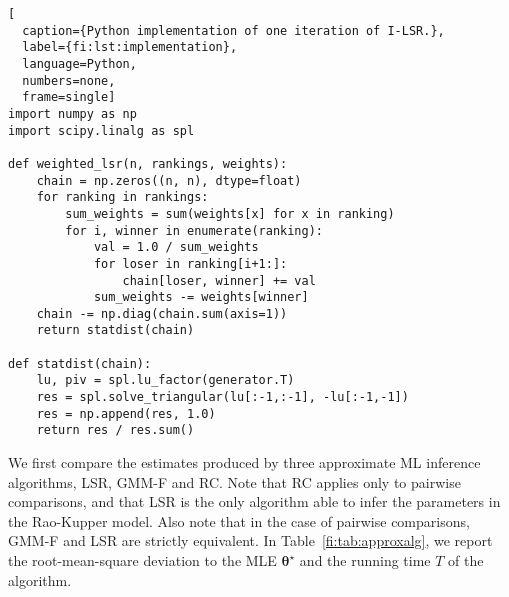\begin{lstlisting}[
  caption={Python implementation of one iteration of I-LSR.},
  label={fi:lst:implementation},
  language=Python,
  numbers=none,
  frame=single]
import numpy as np
import scipy.linalg as spl

def weighted_lsr(n, rankings, weights):
    chain = np.zeros((n, n), dtype=float)
    for ranking in rankings:
        sum_weights = sum(weights[x] for x in ranking)
        for i, winner in enumerate(ranking):
            val = 1.0 / sum_weights
            for loser in ranking[i+1:]:
                chain[loser, winner] += val
            sum_weights -= weights[winner]
    chain -= np.diag(chain.sum(axis=1))
    return statdist(chain)

def statdist(chain):
    lu, piv = spl.lu_factor(generator.T)
    res = spl.solve_triangular(lu[:-1,:-1], -lu[:-1,-1])
    res = np.append(res, 1.0)
    return res / res.sum()
\end{lstlisting}

We first compare the estimates produced by three approximate ML inference algorithms, LSR, GMM-F and RC.
Note that RC applies only to pairwise comparisons, and that LSR is the only algorithm able to infer the parameters in the Rao-Kupper model.
Also note that in the case of pairwise comparisons, GMM-F and LSR are strictly equivalent.
In Table~\ref{fi:tab:approxalg}, we report the root-mean-square deviation to the MLE $\bm{\theta}^\star$ and the running time $T$ of the algorithm.

